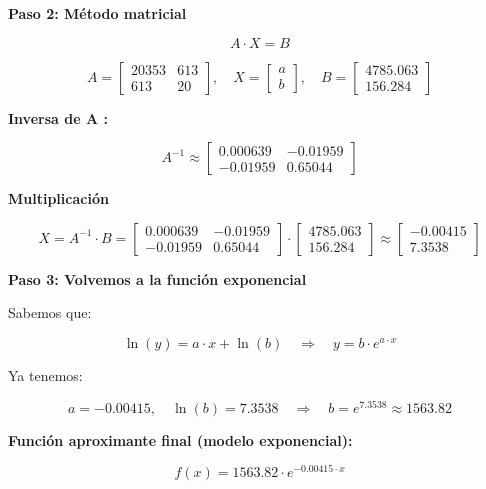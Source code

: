 \documentclass[12pt]{article}
\begin{document}
\vspace{0.3cm}
\textbf{ Paso 2: Método matricial}

\[
A \cdot X = B
\]

\[
A = 
\begin{bmatrix}
20353 & 613 \\
613 & 20
\end{bmatrix}, \quad
X = 
\begin{bmatrix}
a \\
b
\end{bmatrix}, \quad
B = 
\begin{bmatrix}
4785.063 \\
156.284
\end{bmatrix}
\]

\vspace{0.3cm}
\textbf{ Inversa de A :}

\[
A^{-1} \approx 
\begin{bmatrix}
0.000639 & -0.01959 \\
-0.01959 & 0.65044
\end{bmatrix}
\]

\vspace{0.3cm}
\textbf{ Multiplicación}

\[
X = A^{-1} \cdot B =
\begin{bmatrix}
0.000639 & -0.01959 \\
-0.01959 & 0.65044
\end{bmatrix}
\cdot
\begin{bmatrix}
4785.063 \\
156.284
\end{bmatrix}
\approx
\begin{bmatrix}
-0.00415 \\
7.3538
\end{bmatrix}
\]

\vspace{0.3cm}
\textbf{ Paso 3: Volvemos a la función exponencial}

Sabemos que:

\[
\ln(y) = a \cdot x + \ln(b) \quad \Rightarrow \quad y = b \cdot e^{a \cdot x}
\]

Ya tenemos:

\[
a = -0.00415, \quad \ln(b) = 7.3538 \quad \Rightarrow \quad b = e^{7.3538} \approx 1563.82
\]

\vspace{0.3cm}
\textbf{Función aproximante final (modelo exponencial):}

\[
f(x) = 1563.82 \cdot e^{-0.00415 \cdot x}
\]
\end{document}
